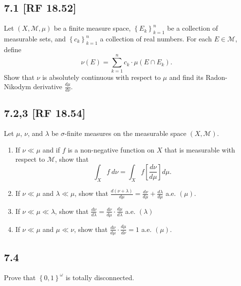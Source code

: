 \documentclass[12pt]{article}
\title{}
\author{Evan P. Walsh}
\begin{document}




\subsection*{7.1 [RF 18.52]}
\begin{tcolorbox}
  Let $(X,\mathcal{M}, \mu)$ be a finite measure space, $\left\{ E_k \right\}_{k=1}^{n}$ be a collection of measurable sets, and $\left\{ c_k
  \right\}_{k=1}^{n}$ a collection of real numbers. For each $E \in \mathcal{M}$, define
  \[ \nu(E) = \sum_{k=1}^{n}c_k \cdot \mu(E\cap E_k). \]
  Show that $\nu$ is absolutely continuous with respect to $\mu$ and find its Radon-Nikodym derivative $\frac{d\mu}{d\nu}$.
\end{tcolorbox}


\subsection*{7.2,3 [RF 18.54]}
\begin{tcolorbox}
  Let $\mu$, $\nu$, and $\lambda$ be $\sigma$-finite measures on the measurable space $(X, \mathcal{M})$.
  \begin{enumerate}[label = (\roman*)]
    \item If $\nu \ll \mu$ and if $f$ is a non-negative function on $X$ that is measurable with respect to $\mathcal{M}$, show that
      \[ \int_{X} f\ d\nu = \int_{X}f\left[ \frac{d\nu}{d\mu} \right]d\mu. \]
    \item If $\nu \ll \mu$ and $\lambda \ll \mu$, show that $\frac{d(\nu + \lambda)}{d\mu} = \frac{d\nu}{d\mu} + \frac{d\lambda}{d\mu}$ a.e. $(\mu)$.
    \item If $\nu \ll \mu \ll \lambda$, show that $\frac{d\nu}{d\lambda} = \frac{d\nu}{d\mu}\cdot \frac{d\mu}{d\lambda}$  a.e. $(\lambda)$
    \item If $\nu \ll \mu$ and $\mu \ll \nu$, show that $\frac{d\nu}{d\mu}\cdot \frac{d\mu}{d\nu} = 1$ a.e. $(\mu)$.
  \end{enumerate}
\end{tcolorbox}


\subsection*{7.4}
\begin{tcolorbox}
  Prove that $\left\{ 0,1 \right\}^{\omega}$ is totally disconnected.
\end{tcolorbox}
\end{document}
